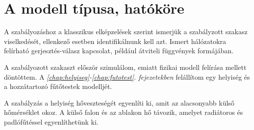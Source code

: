  


\section*{A modell típusa, hatóköre}

A szabályozáshoz a klasszikus elképzelések szerint ismerjük a szabályzott szakasz viselkedését, ellenkező esetben identifikálnunk kell azt. Ismert hálózatokra felírható gerjesztés-válasz kapcsolat, például átviteli függvények formájában. %

A szabályozott szakaszt először szimulálom, emiatt fizikai modell felírása mellett döntöttem. A \textit{\ref{chap:helyiseg}-\ref{chap:futotest}. fejezetekben} felállítom egy helyiség és a hozzátartozó fűtőtestek modelljét. %


A szabályzás a helyiség hőveszteségét egyenlíti ki, amit az alacsonyabb külső hőmérséklet okoz. A külső falon és az ablakon hő távozik, amelyet radiátoros és padlófűtéssel egyenlíthetünk ki.






